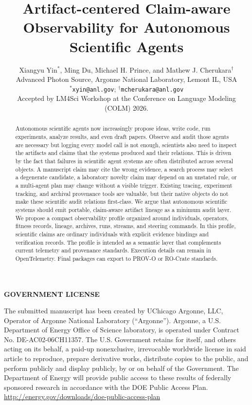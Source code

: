 \documentclass{article}
\title{Artifact-centered Claim-aware Observability for Autonomous Scientific Agents}
\author{
  Xiangyu Yin$^{*}$, Ming Du, Michael H. Prince, and Mathew J. Cherukara$^{\dagger}$ \\
  Advanced Photon Source, Argonne National Laboratory, Lemont IL, USA \\
  $^{*}$\texttt{xyin@anl.gov}; $^{\dagger}$\texttt{mcherukara@anl.gov} \\[0.75em]
  \normalfont Accepted by LM4Sci Workshop at the Conference on Language Modeling (COLM) 2026.
}
\begin{document}
\thispagestyle{empty}
\textbf{GOVERNMENT LICENSE}

The submitted manuscript has been created by UChicago Argonne, LLC, Operator of Argonne National Laboratory (“Argonne”). Argonne, a U.S. Department of Energy Office of Science laboratory, is operated under Contract No. DE-AC02-06CH11357. The U.S. Government retains for itself, and others acting on its behalf, a paid-up nonexclusive, irrevocable worldwide license in said article to reproduce, prepare derivative works, distribute copies to the public, and perform publicly and display publicly, by or on behalf of the Government. The Department of Energy will provide public access to these results of federally sponsored research in accordance with the DOE Public Access Plan. \href{http://energy.gov/downloads/doe-public-access-plan}{http://energy.gov/downloads/doe-public-access-plan}
\clearpage
{}

\maketitle


\begin{abstract}
Autonomous scientific agents now increasingly propose ideas, write code, run experiments, analyze results, and even draft papers. Observe and audit those agents are necessary but logging every model call is not enough, scientists also need to inspect the artifacts and claims that the systems produced and their relations. This is driven by the fact that failures in scientific agent systems are often distributed across several objects. A manuscript claim may cite the wrong evidence, a search process may select a degenerate candidate, a laboratory novelty claim may depend on an unstated rule, or a multi-agent plan may change without a visible trigger. Existing tracing, experiment tracking, and archival provenance tools are valuable, but their native objects do not make these scientific audit relations first-class. We argue that autonomous scientific systems should emit portable, claim-aware artifact lineage as a minimum audit layer. We propose a compact observability profile organized around individuals, operators, fitness records, lineage, archives, runs, streams, and steering commands. In this profile, scientific claims are ordinary individuals with explicit evidence bindings and verification records. The profile is intended as a semantic layer that complements current telemetry and provenance standards. Execution details can remain in OpenTelemetry. Final packages can export to PROV-O or RO-Crate standards.
\end{abstract}
\end{document}
